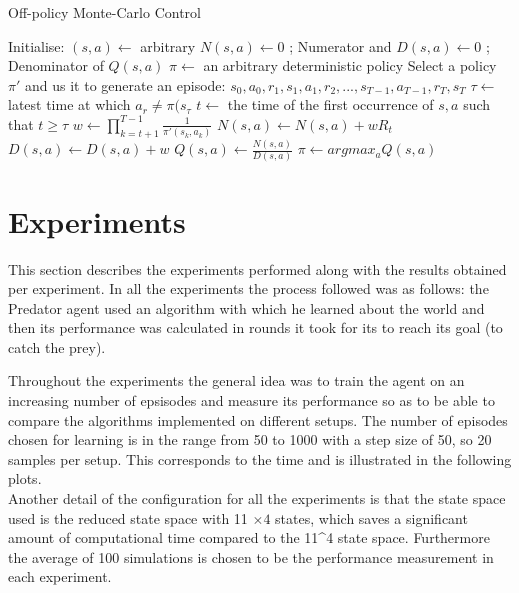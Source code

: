 \documentclass[11pt]{article}
\begin{document}
\begin{algorithm}
\caption{Off-policy Monte-Carlo Control}
\begin{algorithmic}[1]
\label{offpmc}
\STATE Initialise:
\STATE $(s,a) \leftarrow$ arbitrary
\STATE $N(s,a) \leftarrow 0$ \hspace{20mm} ; Numerator and
\STATE $D(s,a) \leftarrow 0$ \hspace{20mm} ; Denominator of $Q(s,a)$
\STATE $\pi \leftarrow$ an arbitrary deterministic policy
\LOOP
\STATE Select a policy $\pi'$ and us it to generate an episode:
\STATE \hspace{20mm} $s_0,a_0,r_1,s_1,a_1,r_2,...,s_{T-1},a_{T-1},r_T,s_T$
\STATE $\tau \leftarrow $ latest time at which $a_r \neq \pi(s_{\tau}$
\STATE $t \leftarrow$ the time of the first occurrence of $s,a$ such that $t \ge \tau$
\STATE $w \leftarrow \prod_{k=t+1}^{T-1} \frac{1}{\pi'(s_k,a_k)}$
\STATE $N(s,a) \leftarrow N(s,a) + wR_t$
\STATE $D(s,a) \leftarrow D(s,a) + w$
\STATE $Q(s,a) \leftarrow \frac{N(s,a)}{D(s,a)}$
\ENDFOR
{}
\STATE $\pi \leftarrow argmax_aQ(s,a)$
\ENDFOR
\ENDLOOP
\ENDFOR
\end{algorithmic}
\end{algorithm}

\section{Experiments}
This section describes the experiments performed along with the results obtained per experiment. In all the experiments the process followed was as follows: the Predator agent used an algorithm with which he learned about the world and then its performance was calculated in rounds it took for its to reach its goal (to catch the prey).

Throughout the experiments the general idea was to train the agent on an increasing number of epsisodes and measure its performance so as to be able to compare the algorithms implemented on different setups. The number of episodes chosen for learning is in the range from 50 to 1000 with a step size of 50, so 20 samples per setup. This corresponds to the time and is illustrated in the following plots.\\
Another detail of the configuration for all the experiments is that the state space used is the reduced state space with 11 $\times4$ states, which saves a significant amount of computational time compared to the 11^4 state space. Furthermore the average  of 100 simulations is chosen to be the performance measurement in each experiment.
\end{document}
